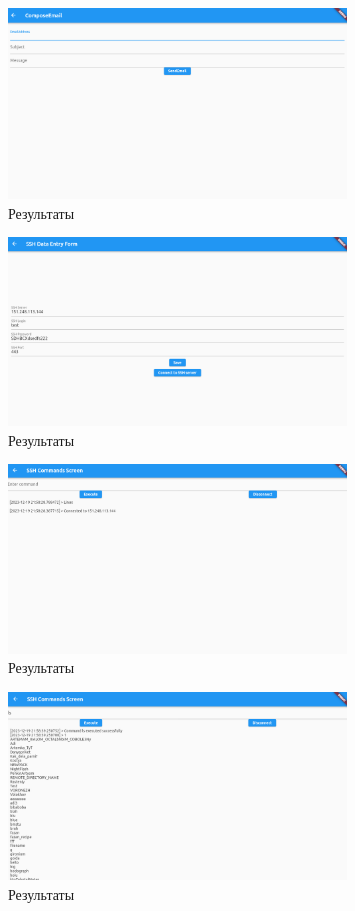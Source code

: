\documentclass[a4paper, 14pt]{extarticle}
\begin{document}
\begin{figure}[!htb]
	\centering
	\includegraphics[width=0.8\textwidth]{img7}
\caption{Результаты}
\label{fig:img7}
\end{figure}

\begin{figure}[!htb]
	\centering
	\includegraphics[width=0.8\textwidth]{img8}
\caption{Результаты}
\label{fig:img8}
\end{figure}

\begin{figure}[!htb]
	\centering
	\includegraphics[width=0.8\textwidth]{img9}
\caption{Результаты}
\label{fig:img9}
\end{figure}

\begin{figure}[!htb]
	\centering
	\includegraphics[width=0.8\textwidth]{img10}
\caption{Результаты}
\label{fig:img10}
\end{figure}
\end{document}
